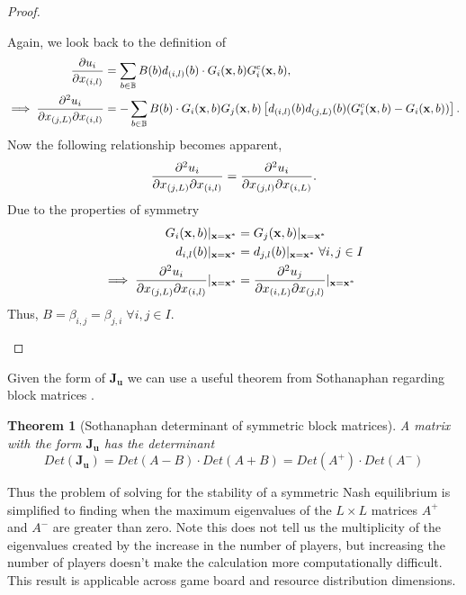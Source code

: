 \documentclass{article}
\newtheorem{theorem}{Theorem}[section]
\begin{document}
\begin{proof}
\begin{enumerate}
                    
                    Again, we look back to the definition of 
                    \begin{align}
                        \pdv{u_i}{x_{(i,l)}}&=\sum_{b\in\mathbb{B}} B(b) d_{(i,l)}(b)\cdot G_i(\mathbf{x},b) G_i^c(\mathbf{x},b), \\ %
                        \implies \pdv[2]{u_i}{x_{(j,L)}}{x_{(i,l)}}&=-\sum_{b\in\mathbb{B}} B(b)\cdot G_i(\mathbf{x},b) G_j(\mathbf{x},b)\left[ d_{(i,l)}(b) d_{(j,L)}(b)(G_i^c(\mathbf{x},b) -G_i(\mathbf{x},b) )\right]. \label{eq:SI_jacobians_B}
                    \end{align}
                    Now the following relationship becomes apparent,
                    \begin{equation}
                         \pdv[2]{u_i}{x_{(j,L)}}{x_{(i,l)}}=\pdv[2]{u_i}{x_{(j,l)}}{x_{(i,L)}}.
                    \end{equation}
                    Due to the properties of symmetry 
                    \begin{align}
                         G_{i}(\mathbf{x},b)|_{\mathbf{x}=\mathbf{x}^*}&=G_{j}(\mathbf{x},b)|_{\mathbf{x}=\mathbf{x}^*}\ \\ %
                        d_{i,l}(b)|_{\mathbf{x}=\mathbf{x}^*}&= d_{j,l}(b)|_{\mathbf{x}=\mathbf{x}^*}\; \forall i,j\in I \\ %
                        \implies \pdv[2]{u_i}{x_{(j,L)}}{x_{(i,l)}}|_{\mathbf{x}=\mathbf{x}^*}&=\pdv[2]{u_j}{x_{(i,L)}}{x_{(j,l)}}|_{\mathbf{x}=\mathbf{x}^*}
                    \end{align}
                    Thus, $B=\beta_{i,j}=\beta_{j,i} \; \forall i,j\in I$.  
                \end{enumerate}
                 
            \end{proof}
            Given the form of $\mathbf{J}_{\mathbf{u}}$ we can use a useful theorem from Sothanaphan regarding block matrices \cite{sothanaphan2017determinants}.
            \begin{theorem}[Sothanaphan determinant of symmetric block matrices]\label{thm:SI_Soth}
                A matrix with the form $\mathbf{J}_{\mathbf{u}}$ has the determinant
                \begin{equation}
                    Det(\mathbf{J}_{\mathbf{u}})=Det(A-B)\cdot Det(A+B)=Det(A^+)\cdot Det(A^-) 
                \end{equation}
            \end{theorem}
            Thus the problem of solving for the stability of a symmetric Nash equilibrium is simplified to finding when the maximum eigenvalues of the $L \times L$ matrices $A^+$ and $A^-$ are greater than zero. Note this does not tell us the multiplicity of the eigenvalues created by the increase in the number of players, but increasing the number of players doesn't make the calculation more computationally difficult. This result is applicable across game board and resource distribution dimensions. 
\end{document}
